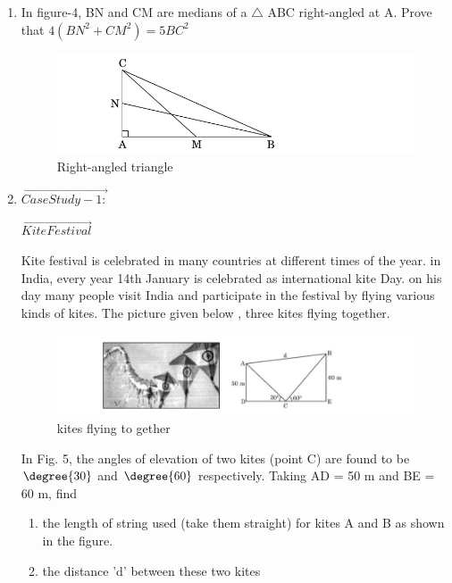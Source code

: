 \begin{enumerate}
\item In figure-4, BN and CM are medians of a $\triangle$ ABC right-angled at A. Prove that $4(BN^2 +CM^2) = 5BC^2$ 
\begin{figure}[H]
\centering
\includegraphics[width=\columnwidth]{figs/rightangled}
\caption{Right-angled triangle}
\label{fig:rightangled4}
\end{figure}
\item $\vec{Case Study - 1:}$
\begin{center}
$\vec{Kite Festival}$\\
\end{center}
Kite festival is celebrated in many countries at different times of the year. in India, every year 14th
January is celebrated as international kite Day. on his day many people visit India and participate in the festival by flying various kinds of kites.
The picture given below , three kites flying together.\\
\begin{figure}[H]
\centering
\includegraphics[width=\columnwidth]{figs/kites}
\caption{kites flying to gether}
\label{fig:kites5}
\end{figure}
In Fig. 5, the angles of elevation of two kites (point C) are found to be $\degree{30}$ and  $\degree{60}$ respectively. Taking AD = 50 m and BE = 60 m, find 
\begin{enumerate}
\item the length of string used (take them straight) for kites A and B as shown in the figure.
\item the distance 'd' between these two kites
\end{enumerate}
\end{enumerate}

